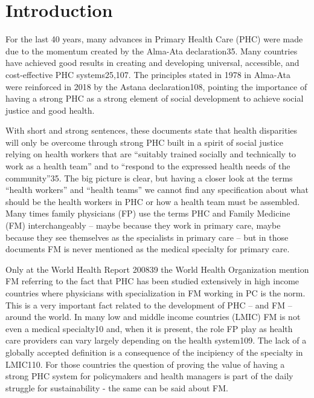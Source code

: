 \documentclass[]{book}
\begin{document}
\hypertarget{introduction-1}{%
\section*{Introduction}\label{introduction-1}}

For the last 40 years, many advances in Primary Health Care (PHC) were made due to the momentum created by the Alma-Ata declaration35. Many countries have achieved good results in creating and developing universal, accessible, and cost-effective PHC systems25,107. The principles stated in 1978 in Alma-Ata were reinforced in 2018 by the Astana declaration108, pointing the importance of having a strong PHC as a strong element of social development to achieve social justice and good health.

With short and strong sentences, these documents state that health disparities will only be overcome through strong PHC built in a spirit of social justice relying on health workers that are ``suitably trained socially and technically to work as a health team'' and to ``respond to the expressed health needs of the community''35. The big picture is clear, but having a closer look at the terms ``health workers'' and ``health teams'' we cannot find any specification about what should be the health workers in PHC or how a health team must be assembled. Many times family physicians (FP) use the terms PHC and Family Medicine (FM) interchangeably -- maybe because they work in primary care, maybe because they see themselves as the specialists in primary care -- but in those documents FM is never mentioned as the medical specialty for primary care.

Only at the World Health Report 200839 the World Health Organization mention FM referring to the fact that PHC has been studied extensively in high income countries where physicians with specialization in FM working in PC is the norm. This is a very important fact related to the development of PHC -- and FM -- around the world. In many low and middle income countries (LMIC) FM is not even a medical specialty10 and, when it is present, the role FP play as health care providers can vary largely depending on the health system109. The lack of a globally accepted definition is a consequence of the incipiency of the specialty in LMIC110. For those countries the question of proving the value of having a strong PHC system for policymakers and health managers is part of the daily struggle for sustainability - the same can be said about FM.
\end{document}

